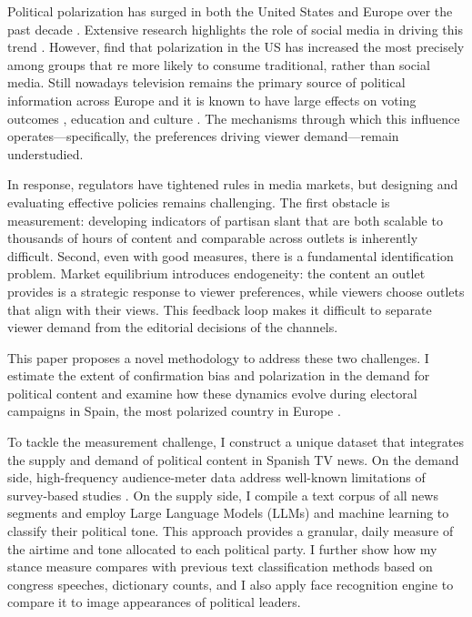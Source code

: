 \documentclass[12pt]{article}
\begin{document}
	
	
	

Political polarization has surged in both the United States and Europe over the past decade \citep{IyengarLelkesLevendusky2019Origins,Reiljan2019FearAL}. Extensive research highlights the role of social media in driving this trend \citep{Zhuravskaya2020}. However, \cite{Boxell2020CrossCountryTI}  find that polarization in the US has increased the most  precisely among groups that re more likely to consume traditional, rather than social media. Still nowadays television remains the primary source of political information across Europe and it is known to have large effects on voting outcomes \citep{dellavigna2007fox, gentzkow_turnout, martin2017}, education \citep{gentzkow2008preschool} and culture \citep{jensen2009power}. The mechanisms through which this influence operates—specifically, the preferences driving viewer demand—remain understudied.

In response, regulators have tightened rules in media markets, but designing and evaluating effective policies remains challenging. The first obstacle is measurement: developing indicators of partisan slant that are both scalable to thousands of hours of content and comparable across outlets is inherently difficult. Second, even with good measures, there is a fundamental identification problem. Market equilibrium introduces endogeneity: the content an outlet provides is a strategic response to viewer preferences, while viewers choose outlets that align with their views. This feedback loop makes it difficult to separate viewer demand from the editorial decisions of the channels.

This paper proposes a novel methodology to address these two challenges. I estimate the extent of confirmation bias and polarization in the demand for political content and examine how these dynamics evolve during electoral campaigns in Spain, the most polarized country in Europe \citep{edelman_trust_2023}.

To tackle the measurement challenge, I construct a unique dataset that integrates the supply and demand of political content in Spanish TV news. On the demand side, high-frequency audience-meter data address well-known limitations of survey-based studies \citep{prior}. On the supply side, I compile a text corpus of all news segments and employ Large Language Models (LLMs) and machine learning to classify their political tone. This approach provides a granular, daily measure of the airtime and tone allocated to each political party. I further show how my stance measure compares with previous text classification methods based on congress speeches, dictionary counts, and I also apply face recognition engine to compare it to image appearances of political leaders.
\end{document}

